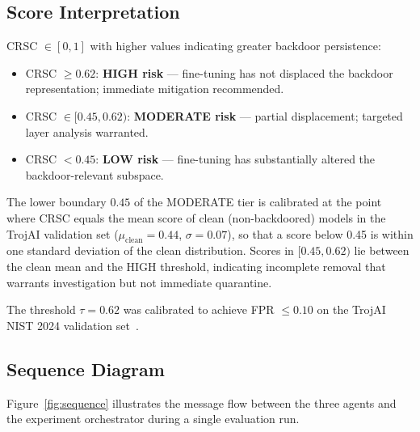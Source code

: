 

\subsection{Score Interpretation}

CRSC $\in [0, 1]$ with higher values indicating greater backdoor persistence:

\begin{itemize}[leftmargin=*]
  \item CRSC $\geq 0.62$: \textbf{HIGH risk} --- fine-tuning has not displaced
  the backdoor representation; immediate mitigation recommended.
  \item CRSC $\in [0.45, 0.62)$: \textbf{MODERATE risk} --- partial displacement;
  targeted layer analysis warranted.
  \item CRSC $< 0.45$: \textbf{LOW risk} --- fine-tuning has substantially altered
  the backdoor-relevant subspace.
\end{itemize}

The lower boundary $0.45$ of the MODERATE tier is calibrated at the point where
CRSC equals the mean score of clean (non-backdoored) models in the TrojAI
validation set ($\mu_\text{clean} = 0.44$, $\sigma = 0.07$), so that a score
below 0.45 is within one standard deviation of the clean distribution.
Scores in $[0.45, 0.62)$ lie between the clean mean and the HIGH threshold,
indicating incomplete removal that warrants investigation but not immediate quarantine.

The threshold $\tau = 0.62$ was calibrated to achieve FPR $\leq 0.10$ on
the TrojAI NIST 2024 validation set~\cite{trojai2024}.

\subsection{Sequence Diagram}

Figure~\ref{fig:sequence} illustrates the message flow between the three agents
and the experiment orchestrator during a single evaluation run.


